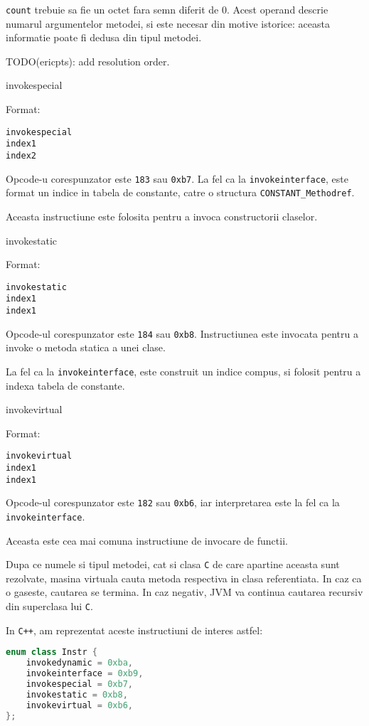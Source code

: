 \texttt{count} trebuie sa fie un octet fara semn diferit de 0. Acest
operand descrie numarul argumentelor metodei, si este necesar din motive
istorice: aceasta informatie poate fi dedusa din tipul metodei.

TODO(ericpts): add resolution order.

invokespecial

Format:

\begin{verbatim}
invokespecial
index1
index2
\end{verbatim}

Opcode-u corespunzator este \texttt{183} sau \texttt{0xb7}. La fel ca la
\texttt{invokeinterface}, este format un indice in tabela de constante,
catre o structura \texttt{CONSTANT\_Methodref}.

Aceasta instructiune este folosita pentru a invoca constructorii
claselor.

invokestatic

Format:

\begin{verbatim}
invokestatic
index1
index1
\end{verbatim}

Opcode-ul corespunzator este \texttt{184} sau \texttt{0xb8}.
Instructiunea este invocata pentru a invoke o metoda statica a unei
clase.

La fel ca la \texttt{invokeinterface}, este construit un indice compus,
si folosit pentru a indexa tabela de constante.

invokevirtual

Format:

\begin{verbatim}
invokevirtual
index1
index1
\end{verbatim}

Opcode-ul corespunzator este \texttt{182} sau \texttt{0xb6}, iar
interpretarea este la fel ca la \texttt{invokeinterface}.

Aceasta este cea mai comuna instructiune de invocare de functii.

Dupa ce numele si tipul metodei, cat si clasa \texttt{C} de care
apartine aceasta sunt rezolvate, masina virtuala cauta metoda respectiva
in clasa referentiata. In caz ca o gaseste, cautarea se termina. In caz
negativ, JVM va continua cautarea recursiv din superclasa lui
\texttt{C}.

In \texttt{C++}, am reprezentat aceste instructiuni de interes astfel:

\begin{lstlisting}[language=C++]
enum class Instr {
    invokedynamic = 0xba,
    invokeinterface = 0xb9,
    invokespecial = 0xb7,
    invokestatic = 0xb8,
    invokevirtual = 0xb6,
};
\end{lstlisting}

